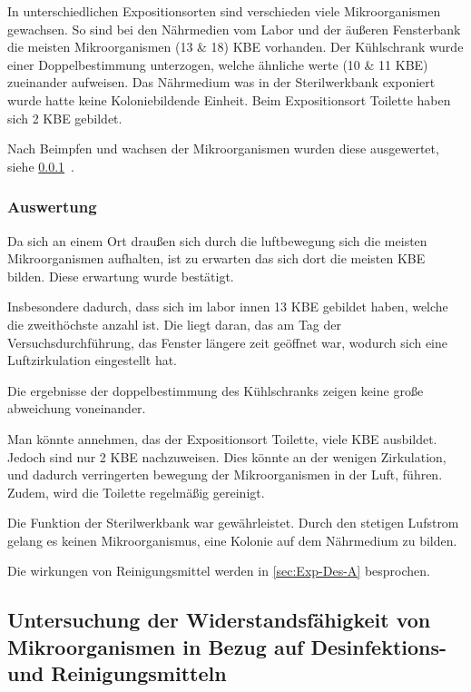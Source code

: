 In unterschiedlichen Expositionsorten sind verschieden viele Mikroorganismen gewachsen.
So sind bei den Nährmedien vom Labor und der äußeren Fensterbank die meisten Mikroorganismen (13 \& 18) KBE vorhanden.
Der Kühlschrank wurde einer Doppelbestimmung unterzogen, welche ähnliche werte (10 \& 11 KBE) zueinander aufweisen.
Das Nährmedium was in der Sterilwerkbank exponiert wurde hatte keine Koloniebildende Einheit.
Beim Expositionsort Toilette haben sich 2 KBE gebildet.

Nach Beimpfen und wachsen der Mikroorganismen wurden diese ausgewertet, siehe 	\ref{sec:Exp-Luft-A}~.

\subsubsection{Auswertung}
\label{sec:Exp-Luft-A}

Da sich an einem Ort draußen sich durch die luftbewegung sich die meisten Mikroorganismen aufhalten, ist zu erwarten das sich dort die meisten KBE bilden.
Diese erwartung wurde bestätigt.

Insbesondere dadurch, dass sich im labor innen 13 KBE gebildet haben, welche die zweithöchste anzahl ist.
Die liegt daran, das am Tag der Versuchsdurchführung, das Fenster längere zeit geöffnet war, wodurch sich eine Luftzirkulation eingestellt hat.

Die ergebnisse der doppelbestimmung des Kühlschranks zeigen keine große abweichung voneinander.

Man könnte annehmen, das der Expositionsort Toilette, viele KBE ausbildet. Jedoch sind nur 2 KBE nachzuweisen.
Dies könnte an der wenigen Zirkulation, und dadurch verringerten bewegung der Mikroorganismen in der Luft, führen.
Zudem, wird die Toilette regelmäßig gereinigt.

Die Funktion der Sterilwerkbank war gewährleistet.
Durch den stetigen Lufstrom gelang es keinen Mikroorganismus, eine Kolonie auf dem Nährmedium zu bilden.

Die wirkungen von Reinigungsmittel werden in \ref{sec:Exp-Des-A} besprochen.
\subsection{Untersuchung der Widerstandsfähigkeit von Mikroorganismen in Bezug auf Desinfektions- und Reinigungsmitteln}
\label{sec:Exp-Des}

